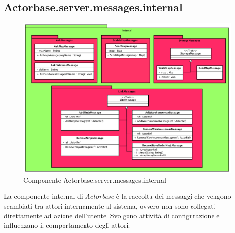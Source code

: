 \documentclass[a4paper]{article}
\begin{document}
	\subsection{Actorbase.server.messages.internal}
		\begin{figure}[H]
			\centering
			\includegraphics[width=\textwidth]{Server/internalLevel.png}
			\caption{Componente Actorbase.server.messages.internal}
		\end{figure}
		La componente internal di \emph{Actorbase} è la raccolta dei messaggi che vengono scambiati tra attori internamente al sistema, ovvero non sono collegati direttamente ad azione dell'utente. Svolgono attività di configurazione e influenzano il comportamento degli attori.
		
\end{document}
